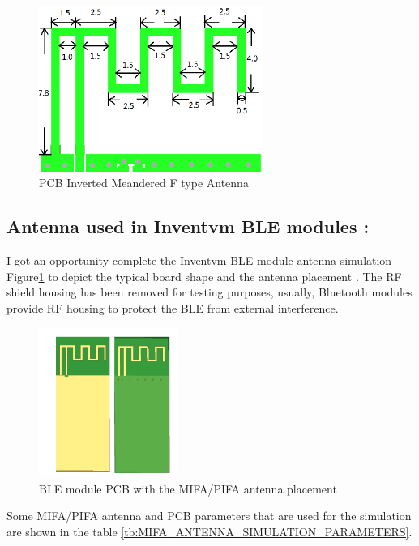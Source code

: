 \begin{figure}[h]
	\centering
	\includegraphics[width=0.65\textwidth]{Chap03/Figures/MIFA_Antenna.PNG}
	\caption{PCB Inverted Meandered F type Antenna \cite{NXP_AN11994_Antenna_Guide} }
	\label{fig:MIFA_Antenna_1}
\end{figure}

\subsection{Antenna used in Inventvm BLE modules :}
\indent I got an opportunity complete the Inventvm BLE module antenna simulation Figure\ref{fig:MIFA_Antenna_1} to depict the typical board shape and the antenna placement \cite{NXPBLE_Antenna_Guide}. The RF shield housing has been removed for testing purposes, usually, Bluetooth modules provide RF housing to protect the BLE from external interference.

\begin{figure}[h]
	\centering
	\includegraphics[width=0.4\textwidth]{Chap03/Figures/mifa_antenna_pcb_example.PNG}
	\caption{BLE module PCB with the MIFA/PIFA antenna placement}
	\label{fig:fig:PIFA_Antenna_PCB}
\end{figure}

Some MIFA/PIFA antenna and PCB parameters that are used for the simulation are shown in the table \ref{tb:MIFA_ANTENNA_SIMULATION_PARAMETERS}.

